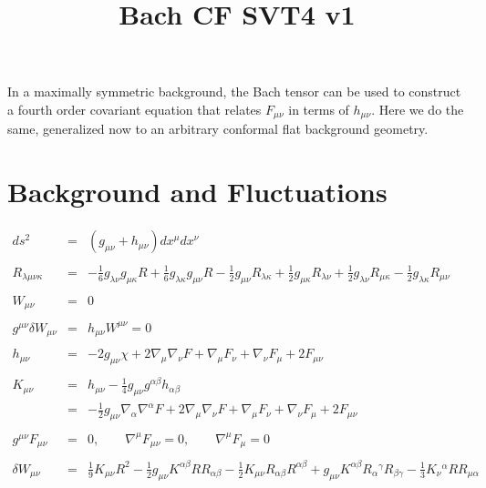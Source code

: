 \documentclass[10pt,letterpaper]{article}
\title{Bach CF SVT4 v1}
\date{}
\numberwithin{equation}{section}
\begin{document}
 
\maketitle
\noindent 
In a maximally symmetric background, the Bach tensor can be used to construct a fourth order covariant equation that relates $F_{\mu\nu}$ in terms of $h_{\mu\nu}$. Here we do the same, generalized now to an arbitrary conformal flat background geometry. 
\section{Background and Fluctuations}
\begin{eqnarray}
ds^2 &=& ( g_{\mu\nu}+ h_{\mu\nu}) dx^\mu dx^\nu
\\ \nonumber\\
R_{\lambda\mu\nu\kappa} &=&- \tfrac{1}{6} g_{\lambda \nu } g_{\mu \kappa } R + \tfrac{1}{6} g_{\lambda \kappa } g_{\mu \nu } R -  \tfrac{1}{2} g_{\mu \nu } R_{\lambda \kappa } + \tfrac{1}{2} g_{\mu \kappa } R_{\lambda \nu } + \tfrac{1}{2} g_{\lambda \nu } R_{\mu \kappa } -  \tfrac{1}{2} g_{\lambda \kappa } R_{\mu \nu }
\\ \nonumber\\
W_{\mu\nu} &=& 0
\\ \nonumber\\
g^{\mu\nu}\delta W_{\mu\nu} &=& h_{\mu\nu}W^{\mu\nu} = 0
\\  \nonumber\\ 
h_{\mu\nu} &=& -2 g_{\mu\nu}\chi + 2\nabla_\mu \nabla_\nu F +\nabla_\mu F_\nu +\nabla_\nu F_\mu+ 2F_{\mu\nu}
\\ \nonumber\\
K_{\mu\nu} &=& h_{\mu\nu} - \tfrac14 g_{\mu\nu} g^{\alpha\beta}h_{\alpha\beta}
\nonumber\\
&=&-\tfrac12 g_{\mu\nu}\nabla_\alpha\nabla^\alpha F + 2\nabla_\mu \nabla_\nu F +\nabla_\mu F_\nu +\nabla_\nu F_\mu+ 2F_{\mu\nu}
\\ \nonumber\\
g^{\mu\nu} F_{\mu\nu} &=&0,\qquad \nabla^\mu F_{\mu\nu} = 0,\qquad \nabla^\mu F_\mu=0 
\\ \nonumber\\
\delta W_{\mu\nu}&=& \tfrac{1}{9} K_{\mu \nu } R^2 -  \tfrac{1}{2} g_{\mu \nu } K^{\alpha \beta } R R_{\alpha \beta } -  \tfrac{1}{2} K_{\mu \nu } R_{\alpha \beta } R^{\alpha \beta } + g_{\mu \nu } K^{\alpha \beta } R_{\alpha }{}^{\gamma } R_{\beta \gamma } -  \tfrac{1}{3} K_{\nu }{}^{\alpha } R R_{\mu \alpha } \nonumber \\ 

\end{eqnarray}
\end{document}

